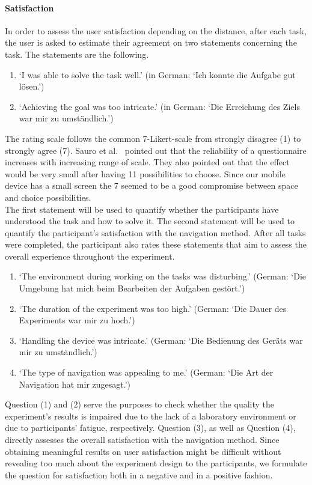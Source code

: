 \documentclass{sig-alternate-05-2015}
\begin{document}
\paragraph{Satisfaction}
In order to assess the user satisfaction depending on the distance, after each task, the user is asked to estimate their
agreement on two statements concerning the task. The statements are the following.
\begin{enumerate}
  \item `I was able to solve the task well.' (in German: `Ich konnte die Aufgabe gut lösen.')
  \item `Achieving the goal was too intricate.' (in German: `Die Erreichung des Ziels war mir zu umständlich.')
\end{enumerate}
The rating scale follows the common 7-Likert-scale from strongly disagree (1) to strongly agree (7). Sauro et al.~\cite{sauro2009comparison} pointed out that the reliability of a questionnaire increases with increasing range of scale. They also pointed out that the effect would be very small after having 11 possibilities to choose. Since our mobile device has a small screen the 7 seemed to be a good compromise between space and choice possibilities.\\
The first statement will be used to quantify whether the participants have understood the task and how to solve it. The second statement will
be used to quantify the participant's satisfaction with the navigation method.
After all tasks were completed, the participant also rates these statements that aim to assess the overall experience throughout the experiment.
\begin{enumerate}
  \item `The environment during working on the tasks was disturbing.' (German: `Die Umgebung hat mich beim Bearbeiten der Aufgaben gestört.')
  \item `The duration of the experiment was too high.' (German: `Die Dauer des Experiments war mir zu hoch.')
  \item `Handling the device was intricate.' (German: `Die Bedienung des Geräts war mir zu umständlich.')
  \item `The type of navigation was appealing to me.' (German: `Die Art der Navigation hat mir zugesagt.')
\end{enumerate}
Question (1) and (2) serve the purposes to check whether the quality the
experiment's results is impaired due to the lack of a laboratory environment or
due to participants' fatigue, respectively. 
Question (3), as well as Question (4), directly assesses the overall satisfaction with the navigation method.
Since obtaining meaningful results on user satisfaction might be difficult without revealing too much about the experiment design to the participants, we formulate the question for satisfaction both in a negative and in a positive fashion.
\end{document}
